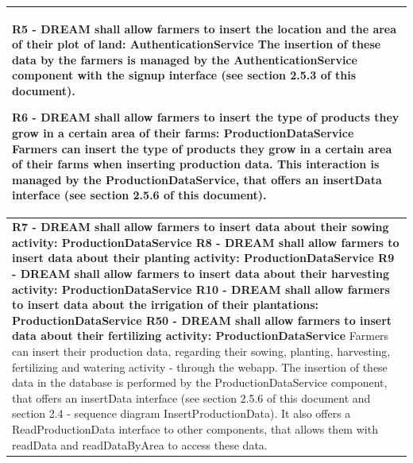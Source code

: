 \documentclass{article}
\begin{document}
\begin{longtable}[c]{|m{11.75cm}|}
    \textbf{R5 - DREAM shall allow farmers to insert the location and the area of their plot
    of land: AuthenticationService}
    \newline\newline
    The insertion of these data by the farmers is managed by the AuthenticationService component with the signup interface (see section 2.5.3 of this document).
    \hline
    
    \textbf{R6 - DREAM shall allow farmers to insert the type of products they grow in a
    certain area of their farms: ProductionDataService}
    \newline\newline
    Farmers can insert the type of products they grow in a certain area of their farms when inserting production data. This interaction is managed by the ProductionDataService, that offers an insertData interface (see section 2.5.6 of this document).\\
    \hline
    
    \textbf{R7 - DREAM shall allow farmers to insert data about their sowing activity: ProductionDataService
    \newline\newline
    R8 - DREAM shall allow farmers to insert data about their planting activity: ProductionDataService
    \newline\newline
    R9 - DREAM shall allow farmers to insert data about their harvesting activity: ProductionDataService
    \newline\newline
    R10 - DREAM shall allow farmers to insert data about the irrigation of their plantations: ProductionDataService
    \newline\newline
    R50 - DREAM shall allow farmers to insert data about their fertilizing activity: ProductionDataService}
    \newline\newline
    Farmers can insert their production data, regarding their sowing, planting, harvesting, fertilizing and watering activity - through the webapp. The insertion of these data in the database is performed by the ProductionDataService component, that offers an insertData interface (see section 2.5.6 of this document and section 2.4 - sequence diagram InsertProductionData).
    It also offers a ReadProductionData interface to other components, that allows them with readData and readDataByArea to access these data.
    \hline
    

\end{longtable}
\end{document}
